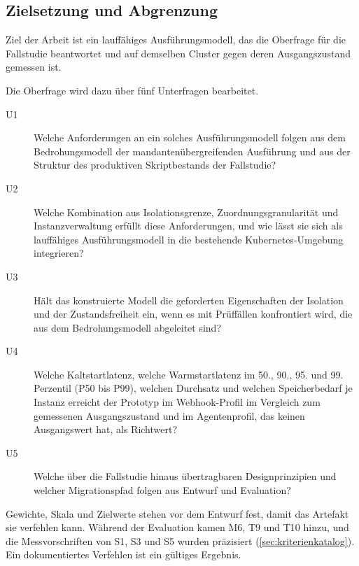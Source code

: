 \subsection{Zielsetzung und Abgrenzung}
\label{sec:einleitung:zielsetzung}

Ziel der Arbeit ist ein lauffähiges Ausführungsmodell, das die Oberfrage für die Fallstudie beantwortet und
auf demselben Cluster gegen deren Ausgangszustand gemessen ist.

Die Oberfrage wird dazu über fünf Unterfragen bearbeitet.

\begin{description}
  \item[U1] \label{rq:u1} Welche Anforderungen an ein solches Ausführungsmodell folgen aus dem
    Bedrohungsmodell der mandantenübergreifenden Ausführung und aus der Struktur des
    produktiven Skriptbestands der Fallstudie?

  \item[U2] \label{rq:u2} Welche Kombination aus Isolationsgrenze, Zuordnungsgranularität und
    Instanzverwaltung erfüllt diese Anforderungen, und wie lässt sie sich als lauffähiges
    Ausführungsmodell in die bestehende Kubernetes-Umgebung integrieren?

  \item[U3] \label{rq:u3} Hält das konstruierte Modell die geforderten Eigenschaften der
    Isolation und der Zustandsfreiheit ein, wenn es mit Prüffällen konfrontiert wird, die aus
    dem Bedrohungsmodell abgeleitet sind?

  \item[U4] \label{rq:u4} Welche Kaltstartlatenz, welche Warmstartlatenz im 50., 90., 95. und 99. Perzentil (P50 bis P99), welchen Durchsatz und welchen Speicherbedarf je Instanz erreicht der
    Prototyp im Webhook-Profil im Vergleich zum gemessenen Ausgangszustand und im Agentenprofil, das keinen Ausgangswert hat, als Richtwert?

  \item[U5] \label{rq:u5} Welche über die Fallstudie hinaus übertragbaren Designprinzipien und
    welcher Migrationspfad folgen aus Entwurf und Evaluation?
\end{description}

Gewichte, Skala und Zielwerte stehen vor dem Entwurf fest, damit das Artefakt sie verfehlen kann. Während der
Evaluation kamen M6, T9 und T10 hinzu, und die Messvorschriften von S1, S3 und S5 wurden präzisiert
(\autoref{sec:kriterienkatalog}). Ein dokumentiertes Verfehlen ist ein gültiges Ergebnis.

